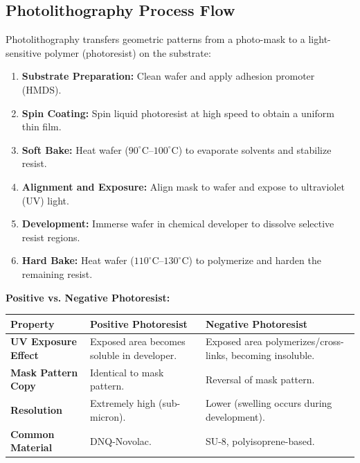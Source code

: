 \documentclass[12pt,a4paper]{article}
\begin{document}
\subsection{Photolithography Process Flow}
Photolithography transfers geometric patterns from a photo-mask to a light-sensitive polymer (photoresist) on the substrate:
\begin{enumerate}[leftmargin=*, label=\arabic*., itemsep=2.5pt]
  \item \textbf{Substrate Preparation:} Clean wafer and apply adhesion promoter (HMDS).
  \item \textbf{Spin Coating:} Spin liquid photoresist at high speed to obtain a uniform thin film.
  \item \textbf{Soft Bake:} Heat wafer ($90^{\circ}\text{C}$--$100^{\circ}\text{C}$) to evaporate solvents and stabilize resist.
  \item \textbf{Alignment and Exposure:} Align mask to wafer and expose to ultraviolet (UV) light.
  \item \textbf{Development:} Immerse wafer in chemical developer to dissolve selective resist regions.
  \item \textbf{Hard Bake:} Heat wafer ($110^{\circ}\text{C}$--$130^{\circ}\text{C}$) to polymerize and harden the remaining resist.
\end{enumerate}

\textbf{Positive vs. Negative Photoresist:}\par\noindent
\begin{tabularx}{\linewidth}{|B{3.2cm}|Y|Y|}
\hline
\textbf{Property} & \textbf{\color{myteal}Positive Photoresist} & \textbf{\color{mygreen}Negative Photoresist} \\
\hline
\textbf{UV Exposure Effect} & Exposed area becomes soluble in developer. & Exposed area polymerizes/cross-links, becoming insoluble. \\
\hline
\textbf{Mask Pattern Copy} & Identical to mask pattern. & Reversal of mask pattern. \\
\hline
\textbf{Resolution} & Extremely high (sub-micron). & Lower (swelling occurs during development). \\
\hline
\textbf{Common Material} & DNQ-Novolac. & SU-8, polyisoprene-based. \\
\hline
\end{tabularx}
\end{document}
